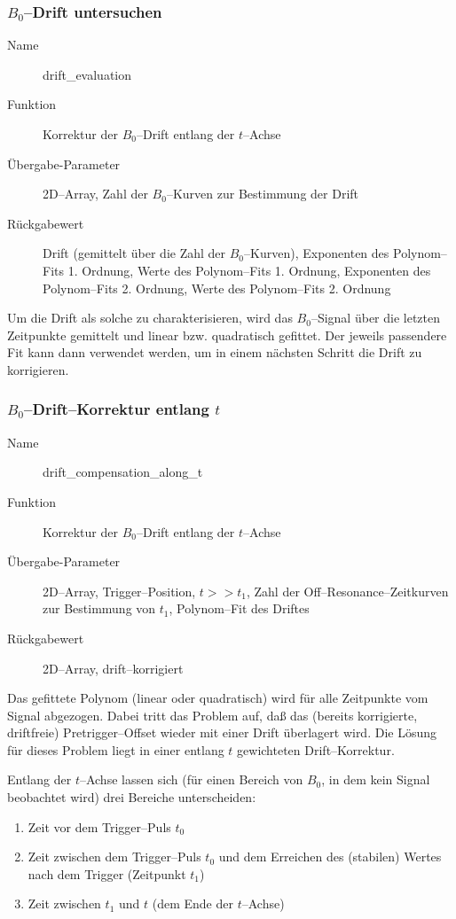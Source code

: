 \documentclass{article}
\begin{document}
\subsubsection{$B_0$--Drift untersuchen}

\begin{description}
  \item[Name] drift\_evaluation
  \item[Funktion] Korrektur der $B_0$--Drift entlang der $t$--Achse
  \item[Übergabe-Parameter] 2D--Array, Zahl der $B_0$--Kurven zur Bestimmung 
  der Drift
  \item[Rückgabewert] Drift (gemittelt über die Zahl der $B_0$--Kurven), 
  Exponenten des Polynom--Fits 1. Ordnung, Werte des Polynom--Fits 1. Ordnung, 
  Exponenten des Polynom--Fits 2. Ordnung, Werte des Polynom--Fits 2. Ordnung
\end{description}

Um die Drift als solche zu charakterisieren, wird das $B_0$--Signal über die 
letzten Zeitpunkte gemittelt und linear bzw. quadratisch gefittet. Der jeweils 
passendere Fit kann dann verwendet werden, um in einem nächsten Schritt die 
Drift zu korrigieren.


\subsubsection{$B_0$--Drift--Korrektur entlang $t$}

\begin{description}
  \item[Name] drift\_compensation\_along\_t
  \item[Funktion] Korrektur der $B_0$--Drift entlang der $t$--Achse
  \item[Übergabe-Parameter] 2D--Array, Trigger--Position, $t >> t_1$, Zahl der 
  Off--Resonance--Zeitkurven zur Bestimmung von $t_1$, Polynom--Fit des Driftes
  \item[Rückgabewert] 2D--Array, drift--korrigiert
\end{description}

Das gefittete Polynom (linear oder quadratisch) wird für alle Zeitpunkte vom 
Signal abgezogen. Dabei tritt das Problem auf, daß das (bereits korrigierte, 
driftfreie) Pretrigger--Offset wieder mit einer Drift überlagert wird. Die 
Lösung für dieses Problem liegt in einer entlang $t$ gewichteten 
Drift--Korrektur.

Entlang der $t$--Achse lassen sich (für einen Bereich von $B_0$, in dem kein 
Signal beobachtet wird) drei Bereiche unterscheiden:
\begin{enumerate}
  \item Zeit vor dem Trigger--Puls $t_0$
  \item Zeit zwischen dem Trigger--Puls $t_0$ und dem Erreichen des (stabilen) 
  Wertes nach dem Trigger (Zeitpunkt $t_1$)
  \item Zeit zwischen $t_1$ und $t$ (dem Ende der $t$--Achse)
\end{enumerate}
\end{document}
